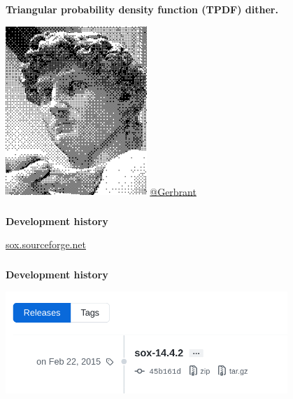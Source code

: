 \documentclass[usenames,dvipsnames, 18pt, compress, aspectratio=169]{beamer}
\begin{document}
\begin{frame}[fragile]{}
    \frametitle{}
    \begin{center}
        \textbf{Triangular probability density function (TPDF) dither.}
        \vspace{0.2cm}

        \includegraphics[width=0.4\textwidth]{dither.png}
        \href{https://en.wikipedia.org/wiki/Dither#/media/File:Michelangelo's_David_-_Bayer.png}
             {\color{black}\fontsize{5pt}{0}\selectfont @Gerbrant}


    \end{center}
\end{frame}

\begin{frame}[fragile]{}
    \frametitle{}
    \begin{center}
        \textbf{Development history}
        \vspace{0.2cm}

        \href{http://sox.sourceforge.net/}{sox.sourceforge.net}

    \end{center}
\end{frame}

\begin{frame}[fragile]{}
    \frametitle{}
    \begin{center}
        \textbf{Development history}
        \vspace{0.2cm}

        \includegraphics[width=0.8\textwidth]{sox-releases.png}

    \end{center}
\end{frame}
\end{document}
